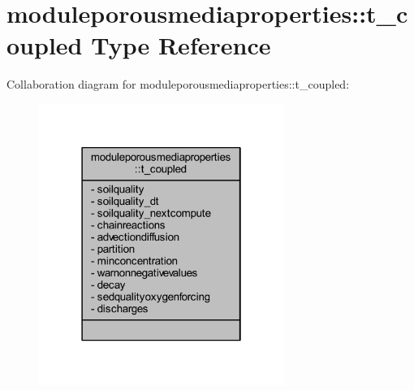 \hypertarget{structmoduleporousmediaproperties_1_1t__coupled}{}\section{moduleporousmediaproperties\+:\+:t\+\_\+coupled Type Reference}
\label{structmoduleporousmediaproperties_1_1t__coupled}


Collaboration diagram for moduleporousmediaproperties\+:\+:t\+\_\+coupled\+:\nopagebreak
\begin{figure}[H]
\begin{center}
\leavevmode
\includegraphics[width=226pt]{structmoduleporousmediaproperties_1_1t__coupled__coll__graph}
\end{center}
\end{figure}
